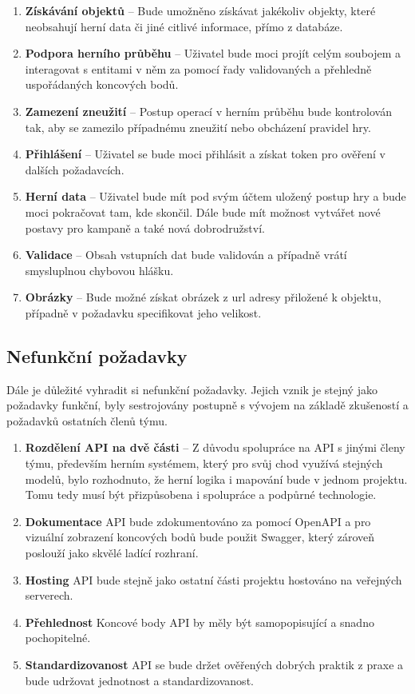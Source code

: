 \begin{enumerate}[label=\textbf{F\arabic*}:, leftmargin=*, align=left]
    \item \textbf{Získávání objektů} -- Bude umožněno získávat jakékoliv objekty, které neobsahují herní data či jiné citlivé informace, přímo z databáze.
    \item \textbf{Podpora herního průběhu} -- Uživatel bude moci projít celým soubojem a interagovat s entitami v něm za pomocí řady validovaných a přehledně uspořádaných koncových bodů.
    \item \textbf{Zamezení zneužití} -- Postup operací v herním průběhu bude kontrolován tak, aby se zamezilo případnému zneužití nebo obcházení pravidel hry.
    \item \textbf{Přihlášení} -- Uživatel se bude moci přihlásit a získat token pro ověření v dalších požadavcích.
    \item \textbf{Herní data} -- Uživatel bude mít pod svým účtem uložený postup hry a bude moci pokračovat tam, kde skončil. Dále bude mít možnost vytvářet nové postavy pro kampaně a také nová dobrodružství.
    \item \textbf{Validace} -- Obsah vstupních dat bude validován a případně vrátí smysluplnou chybovou hlášku.
    \item \textbf{Obrázky} -- Bude možné získat obrázek z url adresy přiložené k objektu, případně v požadavku specifikovat jeho velikost.
\end{enumerate}


\subsection{Nefunkční požadavky}
Dále je důležité vyhradit si nefunkční požadavky. Jejich vznik je stejný jako požadavky funkční, byly sestrojovány postupně s vývojem na základě zkušeností a požadavků ostatních členů týmu.


\begin{enumerate}[label=\textbf{F\arabic*}:, leftmargin=*, align=left]
    \item \textbf{Rozdělení API na dvě části} -- Z důvodu spolupráce na API s jinými členy týmu, především herním systémem, který pro svůj chod využívá stejných modelů, bylo rozhodnuto, že herní logika i mapování bude v jednom projektu. Tomu tedy musí být přizpůsobena i spolupráce a podpůrné technologie.
    \item \textbf{Dokumentace} API bude zdokumentováno za pomocí OpenAPI a pro vizuální zobrazení koncových bodů bude použit Swagger, který zároveň poslouží jako skvělé ladící rozhraní.
    \item \textbf{Hosting} API bude stejně jako ostatní části projektu hostováno na veřejných serverech.
    \item \textbf{Přehlednost} Koncové body API by měly být samopopisující a snadno pochopitelné.
    \item \textbf{Standardizovanost} API se bude držet ověřených dobrých praktik z praxe a bude udržovat jednotnost a standardizovanost.
\end{enumerate}


